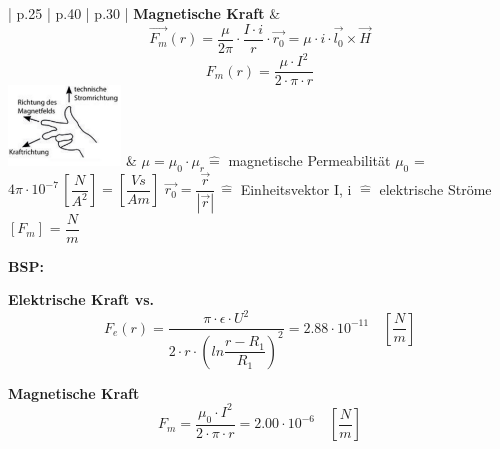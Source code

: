 \begin{longtable}{| p{.25\textwidth} | p{.40\textwidth} | p{.30\textwidth} |}
        \textbf{Magnetische Kraft} \newline
           &	
        \begin{equation*}\vec{F_m}(r) = \dfrac{\mu}{2\pi}\cdot\dfrac{I\cdot i}{r}\cdot\vec{r_0} = \mu\cdot i\cdot \vec{l_0}\times\vec{H}\end{equation*} 
        \begin{equation*}F_m(r) = \dfrac{\mu\cdot I^2}{2\cdot\pi\cdot r}\end{equation*} 
        \includegraphics[width=3cm]{images/magkraft}	& \newline
        $\mu =\mu_0\cdot\mu_r$\newline $\widehat{=}$ magnetische Permeabilität\newline 
        $\mu_0$ = $4\pi\cdot 10^{-7} \,\left[\dfrac{N}{A^2}\right]=\left[\dfrac{Vs}{Am}\right]$ \newline \newline
        $\vec{r_0}=\dfrac{\vec{r}}{|\vec{r}|}\,\widehat{=}$ Einheitsvektor \newline \newline 
        I, i $\widehat{=}$ elektrische Ströme 	\newline \newline 
        $[F_m]$ = $\dfrac{N}{m}$
        \\ \hline
    \end{longtable}  
    
    \begin{minipage}{7cm}
        \textbf{BSP:}\newline
         \null\hspace{3.5cm}
    \end{minipage}
    \begin{multicols}{2}
        \begin{minipage}{\linewidth}
           \textbf{Elektrische Kraft vs.}\newline
            \begin{equation*}
            F_e(r) = \dfrac{\pi\cdot\epsilon\cdot U^2}{2\cdot r\cdot\left(ln\dfrac{r-R_1}{R_1}\right)^2} = 2.88\cdot 10^{-11} \quad \left[\dfrac{N}{m}\right]
            \end{equation*}
        \end{minipage}

        \begin{minipage}{\linewidth}
            \textbf{Magnetische Kraft}\newline
            \begin{equation*}
             F_m = \dfrac{\mu_0\cdot I^2}{2\cdot\pi\cdot r} = 2.00 \cdot 10^{-6} \quad\left[\dfrac{N}{m}\right]
            \end{equation*}
        \end{minipage}        
    \end{multicols}
    
